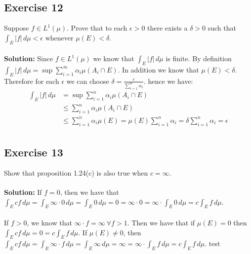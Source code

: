 \documentclass{article}
\begin{document}
\subsection*{Exercise 12}
Suppose $f \in L^1(\mu)$. Prove that to each $\epsilon > 0$ there exists a $\delta>0$ such that $\int_E |f| \,d\mu < \epsilon$
whenever $\mu(E) < \delta$.
\\\\
\textbf{Solution:}
Since $f\in L^1(\mu)$ we know that $\int_E |f| \, d\mu$ is finite.
By definition $\int_E |f| \, d\mu = \sup \sum_{i=1}^{\infty} \alpha_i \mu(A_i \cap E)$.
In addition we know that $\mu(E) < \delta$. Therefore for each $\epsilon$ we can choose $\delta = \frac{\epsilon}{\sum_{i=1}^{n} \alpha_i}$.
hence we have:
\begin{equation*}
    \begin{aligned}
        \int_E |f| \, d\mu &= \sup \sum_{i=1}^{n} \alpha_i \mu(A_i \cap E)\\
        &\le \sum_{i=1}^{n} \alpha_i \mu(A_i \cap E)\\
        &\le \sum_{i=1}^{n} \alpha_i \mu(E)  = \mu(E) \sum_{i=1}^{n} \alpha_i = \delta \sum_{i=1}^{n} \alpha_i = \epsilon \\
    \end{aligned}
\end{equation*}
\subsection*{Exercise 13}
Show that proposition 1.24(c) is also true when $c = \infty$.
\\\\
\textbf{Solution:}
If $f = 0$, then we have that $\int_E cf \,d\mu = \int_E \infty \cdot 0 \,d\mu = \int_E 0 \,d\mu = 0 = \infty \cdot 0 = \infty \cdot \int_E 0 \,d\mu =  c \int_E f \,d\mu$.
\\\\
If $f > 0$, we know that $\infty \cdot f = \infty \ \forall f>1$.
Then we have that if $\mu(E) = 0$ then $\int_E cf \,d\mu = 0 =  c \int_E f \,d\mu$.
If $\mu(E) \neq 0$, then $\int_E cf \,d\mu = \int_E \infty \cdot f \,d\mu = \int_E \infty \,d\mu = \infty = \infty \cdot \int_E f \,d\mu = c\int_E f \,d\mu$.
test
\end{document}
